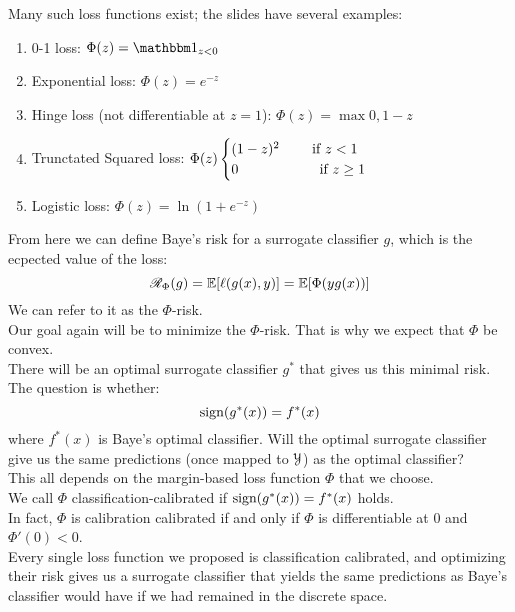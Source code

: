 \documentclass[12pt]{article}
\begin{document}
Many such loss functions exist;
the slides have several examples:
\begin{enumerate}
    \item 
    0-1 loss: $\Phi(z) = \indicator_{z<0}$
    \item
    Exponential loss: $\Phi(z) = e^{-z}$
    \item
    Hinge loss
    (not differentiable at $z = 1$):
    $\Phi(z) = \max{0, 1-z}$
    \item
    Trunctated Squared loss:
    $\Phi(z) \begin{cases} (1-z)^2 \qquad \text{ if } z < 1 \\ 0 \hspace{35pt} \qquad \text{ if } z \geq 1 \end{cases}$
    \item 
    Logistic loss:
    $\Phi(z) = \ln(1 + e^{-z})$ \\
\end{enumerate}

From here we can define Baye's risk for a
surrogate classifier $g$,
which is the ecpected value of the loss:
\[ \mathscr{R}_\Phi(g) = \mathbb{E}[\ell(g(x), y)]
= \mathbb{E}[\Phi(yg(x))] \]
We can refer to it as the $\Phi$-risk. \\

Our goal again will be to minimize the
$\Phi$-risk.
That is why we expect that $\Phi$ be convex. \\
There will be an optimal surrogate classifier
$g^*$ that gives us this minimal risk. \\
The question is whether:
\[ \text{sign}(g^*(x)) = f^*(x) \]
where $f^*(x)$ is Baye's optimal classifier.
Will the optimal surrogate classifier give
us the same predictions
(once mapped to $\mathcal{Y}$) as the optimal
classifier? \\

This all depends on the margin-based 
loss function $\Phi$ that we choose. \\
We call $\Phi$ classification-calibrated
if $\text{sign}(g^*(x)) = f^*(x)$ holds. \\

In fact, $\Phi$ is calibration calibrated
if and only if $\Phi$ is differentiable at $0$
and $\Phi'(0) < 0$. \\
Every single loss function we proposed
is classification calibrated,
and optimizing their risk gives us a surrogate
classifier that yields the same predictions
as Baye's classifier would have
if we had remained in the discrete space. \\
\end{document}
